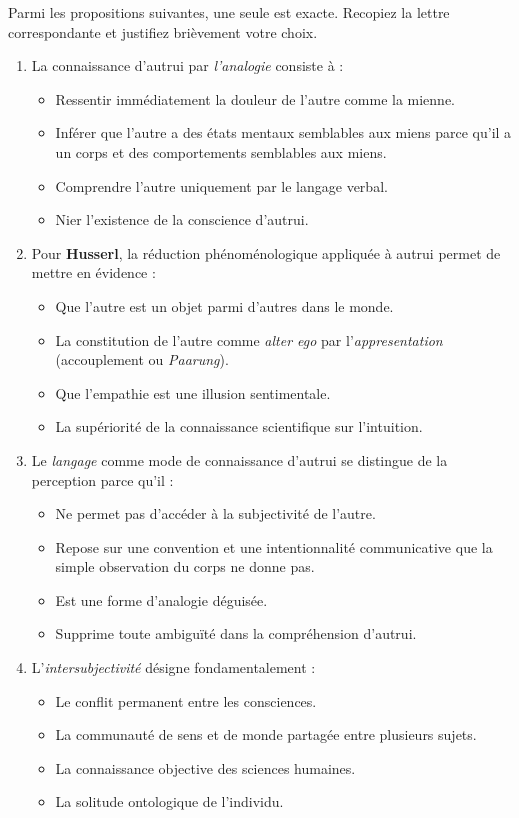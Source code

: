 \documentclass[11pt]{article}
\begin{document}
\begin{exercice}
Parmi les propositions suivantes, une seule est exacte. Recopiez la lettre correspondante et justifiez brièvement votre choix.
\begin{enumerate}
    \item La connaissance d'autrui par \emph{l'analogie} consiste à :
    \begin{itemize}
        \item[A.] Ressentir immédiatement la douleur de l'autre comme la mienne.
        \item[B.] Inférer que l'autre a des états mentaux semblables aux miens parce qu'il a un corps et des comportements semblables aux miens.
        \item[C.] Comprendre l'autre uniquement par le langage verbal.
        \item[D.] Nier l'existence de la conscience d'autrui.
    \end{itemize}
    \item Pour \textbf{Husserl}, la réduction phénoménologique appliquée à autrui permet de mettre en évidence :
    \begin{itemize}
        \item[A.] Que l'autre est un objet parmi d'autres dans le monde.
        \item[B.] La constitution de l'autre comme \emph{alter ego} par l'\emph{appresentation} (accouplement ou \emph{Paarung}).
        \item[C.] Que l'empathie est une illusion sentimentale.
        \item[D.] La supériorité de la connaissance scientifique sur l'intuition.
    \end{itemize}
    \item Le \emph{langage} comme mode de connaissance d'autrui se distingue de la perception parce qu'il :
    \begin{itemize}
        \item[A.] Ne permet pas d'accéder à la subjectivité de l'autre.
        \item[B.] Repose sur une convention et une intentionnalité communicative que la simple observation du corps ne donne pas.
        \item[C.] Est une forme d'analogie déguisée.
        \item[D.] Supprime toute ambiguïté dans la compréhension d'autrui.
    \end{itemize}
    \item L'\emph{intersubjectivité} désigne fondamentalement :
    \begin{itemize}
        \item[A.] Le conflit permanent entre les consciences.
        \item[B.] La communauté de sens et de monde partagée entre plusieurs sujets.
        \item[C.] La connaissance objective des sciences humaines.
        \item[D.] La solitude ontologique de l'individu.
    \end{itemize}
\end{enumerate}
\end{exercice}
\end{document}
